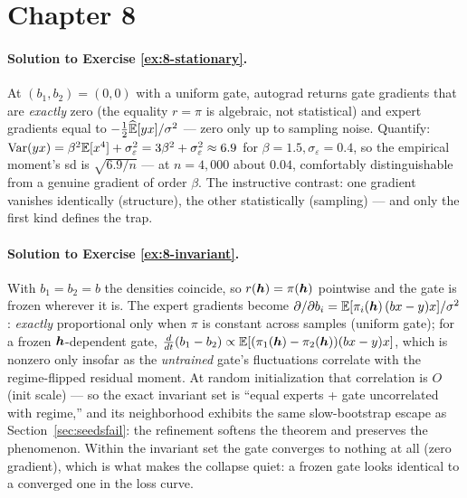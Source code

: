 \section*{Chapter 8}

\paragraph{Solution to Exercise \ref{ex:8-stationary}.}
At $(b_1, b_2) = (0,0)$ with a uniform gate, autograd returns gate
gradients that are \emph{exactly} zero (the equality $r = \pi$ is
algebraic, not statistical) and expert gradients equal to
$-\tfrac12\widehat{\mathbb{E}}[yx]/\sigma^2$ --- zero only up to sampling
noise. Quantify: $\operatorname{Var}(yx) = \beta^2\mathbb{E}[x^4] + \sigma_\varepsilon^2 =
3\beta^2 + \sigma_\varepsilon^2 \approx 6.9$ for $\beta = 1.5,
\sigma_\varepsilon = 0.4$, so the empirical moment's sd is
$\sqrt{6.9/n}$ --- at $n = 4{,}000$ about $0.04$, comfortably
distinguishable from a genuine gradient of order $\beta$. The
instructive contrast: one gradient vanishes identically (structure),
the other statistically (sampling) --- and only the first kind defines
the trap.

\paragraph{Solution to Exercise \ref{ex:8-invariant}.}
With $b_1 = b_2 = b$ the densities coincide, so $r(\bm{h}) = \pi(\bm{h})$
pointwise and the gate is frozen wherever it is. The expert gradients
become $\partial/\partial b_i = \mathbb{E}[\pi_i(\bm{h})\,(bx - y)x]/\sigma^2$:
\emph{exactly} proportional only when $\pi$ is constant across samples
(uniform gate); for a frozen $\bm{h}$-dependent gate,
$\tfrac{d}{dt}(b_1 - b_2) \propto \mathbb{E}[(\pi_1(\bm{h}) -
\pi_2(\bm{h}))(bx - y)x]$, which is nonzero only insofar as the
\emph{untrained} gate's fluctuations correlate with the regime-flipped
residual moment. At random initialization that correlation is $O$(init
scale) --- so the exact invariant set is ``equal experts + gate
uncorrelated with regime,'' and its neighborhood exhibits the same
slow-bootstrap escape as Section~\ref{sec:seedsfail}: the refinement
softens the theorem and preserves the phenomenon. Within the invariant
set the gate converges to nothing at all (zero gradient), which is what
makes the collapse quiet: a frozen gate looks identical to a converged
one in the loss curve.

